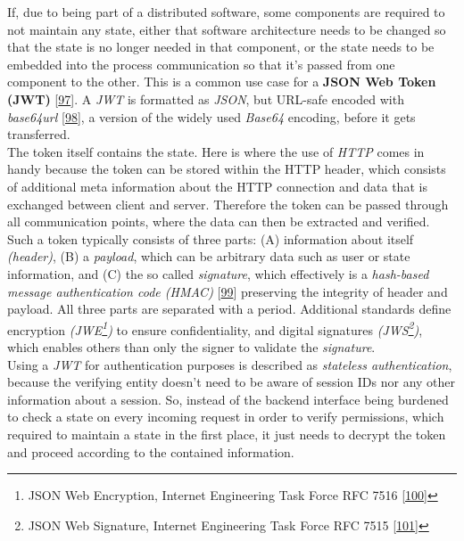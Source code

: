 \documentclass[12pt,english,a4paper,titlepage,cleardoublepage=empty,dottedtoc]{report}
\begin{document}
If, due to being part of a distributed software, some components are
required to not maintain any state, either that software architecture
needs to be changed so that the state is no longer needed in that
component, or the state needs to be embedded into the process
communication so that it's passed from one component to the other. This
is a common use case for a \textbf{\protect\hypertarget{def--jwt}{}{JSON
Web Token (JWT)}}
{[}\protect\hyperlink{ref-web_spec_json-web-token}{97}{]}. A \emph{JWT}
is formatted as \emph{JSON}, but URL-safe encoded with \emph{base64url}
{[}\protect\hyperlink{ref-web_spec_base64url}{98}{]}, a version of the
widely used \emph{Base64} encoding, before it gets transferred.\\
The token itself contains the state. Here is where the use of
\emph{HTTP} comes in handy because the token can be stored within the
HTTP header, which consists of additional meta information about the
HTTP connection and data that is exchanged between client and server.
Therefore the token can be passed through all communication points,
where the data can then be extracted and verified. Such a token
typically consists of three parts: (A) information about itself
\emph{(header)}, (B) a \emph{payload}, which can be arbitrary data such
as user or state information, and (C) the so called \emph{signature},
which effectively is a \emph{hash-based message authentication code
(HMAC)} {[}\protect\hyperlink{ref-web_spec_hmac}{99}{]} preserving the
integrity of header and payload. All three parts are separated with a
period. Additional standards define encryption \emph{(JWE\footnote{JSON
  Web Encryption, Internet Engineering Task Force RFC 7516
  {[}\protect\hyperlink{ref-web_spec_json-web-encryption}{100}{]}})} to
ensure confidentiality, and digital signatures \emph{(JWS\footnote{JSON
  Web Signature, Internet Engineering Task Force RFC 7515
  {[}\protect\hyperlink{ref-web_spec_json-web-signature}{101}{]}})},
which enables others than only the signer to validate the
\emph{signature}.\\
Using a \emph{JWT} for authentication purposes is described as
\emph{stateless authentication}, because the verifying entity doesn't
need to be aware of session IDs nor any other information about a
session. So, instead of the backend interface being burdened to check a
state on every incoming request in order to verify permissions, which
required to maintain a state in the first place, it just needs to
decrypt the token and proceed according to the contained information.
\end{document}
